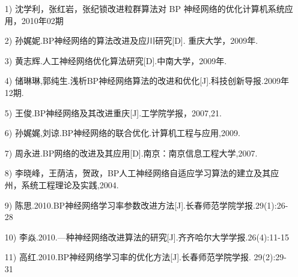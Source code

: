 \documentclass[UTF8]{ctexart}
\begin{document}
\begin{itemize}
\item [1)]
沈学利，张红岩，张纪锁改进粒群算法对 BP 神经网络的优化计算机系统应用，2010年02期
\item [2)]
孙娓妮.BP神经网络的算法改进及应川研究[D]. 重庆大学，2009年.
\item [3)]
黄志辉.人工神经网络优化算法研究[D].中南大学，2009年.
\item [4)]
储琳琳,郭纯生.浅析BP神经网络算法的改进和优化[J].科技创新导报.2009年12期.
\item [5)]
王俊.BP神经网络及其改进重庆[J].工学院学报，2007,21.
\item [6)]
孙娓娓,刘谅.BP神经网络的联合优化.计算机工程与应用,2009.
\item [7)]
周永进.BP网络的改进及其应用[D].南京：南京信息工程大学,2007.
\item [8)]
李晓峰，王荫洁，贺政，BP人工神经网络自适应学习算法的建立及其应州，系统工程理论及实践,2004.
\item [9)]
陈思.2010.BP神经网络学习率参数改进方法[J].长春师范学院学报.29(1):26-28
\item [10)]
李焱.2010.—种神经网络改进算法的研究[J].齐齐哈尔大学学报.26(4):11-15
\item [11)]
高红.2010.BP神经网络学习率的优化方法[J].长春师范学院学报. 29(2):29-31


\end{itemize}
\end{document}

